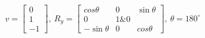 \documentclass[preview]{standalone}
\begin{document}
\begin{align*}
v = \begin{bmatrix}
                        0\\
                        1\\
                        -1
                        \end{bmatrix}, \ 
                        R_y = \begin{bmatrix}
                        cos \theta & 0 & \sin \theta\\
                        0 & 1\& 0 \\
                        -\sin \theta & 0 & cos \theta 
                        \end{bmatrix}, \ 
                        \theta = 180^\circ
\end{align*}
\end{document}
